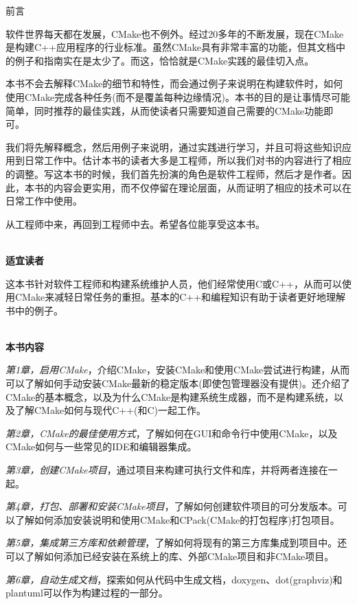 \begin{flushright}
	 前言
\end{flushright}

软件世界每天都在发展，CMake也不例外。经过20多年的不断发展，现在CMake是构建C++应用程序的行业标准。虽然CMake具有非常丰富的功能，但其文档中的例子和指南实在是太少了。而这，恰恰就是CMake实践的最佳切入点。

本书不会去解释CMake的细节和特性，而会通过例子来说明在构建软件时，如何使用CMake完成各种任务(而不是覆盖每种边缘情况)。本书的目的是让事情尽可能简单，同时推荐的最佳实践，从而使读者只需要知道自己需要的CMake功能即可。

我们将先解释概念，然后用例子来说明，通过实践进行学习，并且可将这些知识应用到日常工作中。估计本书的读者大多是工程师，所以我们对书的内容进行了相应的调整。写这本书的时候，我们首先扮演的角色是软件工程师，然后才是作者。因此，本书的内容会更实用，而不仅停留在理论层面，从而证明了相应的技术可以在日常工作中使用。

从工程师中来，再回到工程师中去。希望各位能享受这本书。

\hspace*{\fill} \\ %
\textbf{适宜读者}

这本书针对软件工程师和构建系统维护人员，他们经常使用C或C++，从而可以使用CMake来减轻日常任务的重担。基本的C++和编程知识有助于读者更好地理解书中的例子。

\hspace*{\fill} \\ %
\textbf{本书内容}

\textit{第1章，启用CMake}，介绍CMake，安装CMake和使用CMake尝试进行构建，从而可以了解如何手动安装CMake最新的稳定版本(即使包管理器没有提供)。还介绍了CMake的基本概念，以及为什么CMake是构建系统生成器，而不是构建系统，以及了解CMake如何与现代C++(和C)一起工作。

\textit{第2章，CMake的最佳使用方式}，了解如何在GUI和命令行中使用CMake，以及CMake如何与一些常见的IDE和编辑器集成。

\textit{第3章，创建CMake项目}，通过项目来构建可执行文件和库，并将两者连接在一起。

\textit{第4章，打包、部署和安装CMake项目}，了解如何创建软件项目的可分发版本。可以了解如何添加安装说明和使用CMake和CPack(CMake的打包程序)打包项目。

\textit{第5章，集成第三方库和依赖管理}，了解如何将现有的第三方库集成到项目中。还可以了解如何添加已经安装在系统上的库、外部CMake项目和非CMake项目。

\textit{第6章，自动生成文档}，探索如何从代码中生成文档，doxygen、dot(graphviz)和plantuml可以作为构建过程的一部分。

